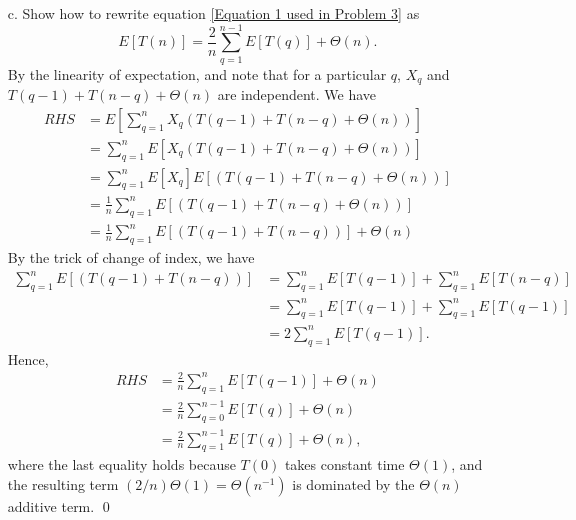 \documentclass[12pt,reqno]{amsart}
\newif\ifanswer
\begin{document}
\begin{enumerate}[1.]
\begin{enumerate}
    \item[c.] Show how to rewrite equation \ref{Equation 1 used in Problem 3} as
    \begin{equation}
    E[T(n)] = \frac{2}{n}\sum_{q = 1}^{n - 1}{E[T(q)]} + \Theta(n).
    \tag{7.3}
    \label{Equation 2 used in Problem 3}
    \end{equation}
    \ifanswer
    \noindent {\bf \\Solution}
    By the linearity of expectation, and note that for a particular $q$, $X_q$ and $T(q - 1) + T(n - q) + \Theta(n)$ are independent. We have
    \begin{align*}
        RHS &= E\left[\sum_{q = 1}^n{X_q\left(T(q - 1) + T(n - q) + \Theta(n)\right)}\right]\\
        &= \sum_{q = 1}^n{E\left[X_q\left(T(q - 1) + T(n - q) + \Theta(n)\right)\right]}\\
        &= \sum_{q = 1}^n{E[X_q]E\left[\left(T(q - 1) + T(n - q) + \Theta(n)\right)\right]}\\
        &= \frac{1}{n}\sum_{q = 1}^n{E\left[\left(T(q - 1) + T(n - q) + \Theta(n)\right)\right]}\\
        &= \frac{1}{n}\sum_{q = 1}^n{E\left[\left(T(q - 1) + T(n - q)\right)\right]} + \Theta(n)
    \end{align*}
    By the trick of change of index, we have
    \begin{align*}
        \sum_{q = 1}^n{E\left[\left(T(q - 1) + T(n - q)\right)\right]} &= \sum_{q = 1}^n{E\left[T(q - 1)\right]} + \sum_{q = 1}^n{E\left[T(n - q)\right]}\\
        &= \sum_{q = 1}^n{E\left[T(q - 1)\right]} + \sum_{q = 1}^n{E\left[T(q - 1)\right]}\\
        &= 2\sum_{q = 1}^n{E\left[T(q - 1)\right]}.
    \end{align*}
    Hence,
    \begin{align*}
        RHS &= \frac{2}{n}\sum_{q = 1}^n{E\left[T(q - 1)\right]} + \Theta(n)\\
        &= \frac{2}{n}\sum_{q = 0}^{n - 1}{E\left[T(q)\right]} + \Theta(n)\\
        &= \frac{2}{n}\sum_{q = 1}^{n - 1}{E\left[T(q)\right]} + \Theta(n),
    \end{align*}
    where the last equality holds because $T(0)$ takes constant time $\Theta(1)$, and the resulting term $(2/n)\Theta(1) = \Theta(n^{-1})$ is dominated by the $\Theta(n)$ additive term. \qed
    

\end{enumerate}
\end{enumerate}
\end{document}
